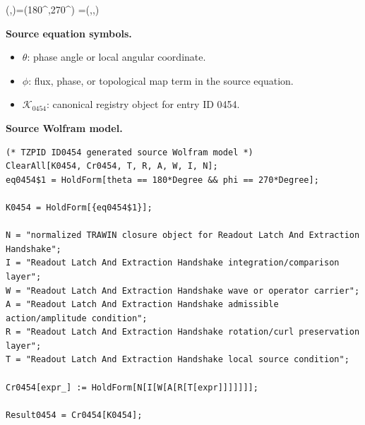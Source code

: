 \tzpequationlinks
  {(\theta,\phi)=(180^{\circ},270^{\circ})}
  {=\left(\sin\theta\cos\phi,\sin\theta\sin\phi,\cos\theta\right)}
  {\lVert{}}

\begin{minipage}[t]{0.49\linewidth}
\begingroup
\small
\raggedright
\textbf{Source equation symbols.}\par
\begin{itemize}[leftmargin=1.35em,itemsep=1pt,topsep=1pt,parsep=0pt]
    \item $\theta$: phase angle or local angular coordinate.
    \item $\phi$: flux, phase, or topological map term in the source equation.
    \item $\mathcal{K}_{0454}$: canonical registry object for entry ID 0454.
\end{itemize}
\endgroup
\end{minipage}\hfill
\begin{minipage}[t]{0.47\linewidth}
\begingroup
\scriptsize
\raggedright
\textbf{Source Wolfram model.}\par
\begin{Verbatim}[fontsize=\tiny,breaklines=true,breakanywhere=true]
(* TZPID ID0454 generated source Wolfram model *)
ClearAll[K0454, Cr0454, T, R, A, W, I, N];
eq0454$1 = HoldForm[theta == 180*Degree && phi == 270*Degree];

K0454 = HoldForm[{eq0454$1}];

N = "normalized TRAWIN closure object for Readout Latch And Extraction Handshake";
I = "Readout Latch And Extraction Handshake integration/comparison layer";
W = "Readout Latch And Extraction Handshake wave or operator carrier";
A = "Readout Latch And Extraction Handshake admissible action/amplitude condition";
R = "Readout Latch And Extraction Handshake rotation/curl preservation layer";
T = "Readout Latch And Extraction Handshake local source condition";

Cr0454[expr_] := HoldForm[N[I[W[A[R[T[expr]]]]]]];

Result0454 = Cr0454[K0454];
\end{Verbatim}
\endgroup
\end{minipage}

